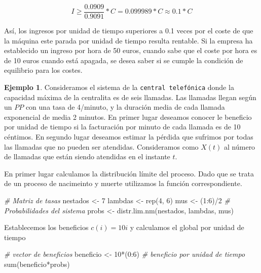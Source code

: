 \documentclass[
]{book}
\newenvironment{Shaded}{\begin{snugshade}}{\end{snugshade}}
\newcommand{\CommentTok}[1]{\textcolor[rgb]{0.56,0.35,0.01}{\textit{#1}}}
\newcommand{\DecValTok}[1]{\textcolor[rgb]{0.00,0.00,0.81}{#1}}
\newcommand{\FunctionTok}[1]{\textcolor[rgb]{0.00,0.00,0.00}{#1}}
\newcommand{\NormalTok}[1]{#1}
\newcommand{\OtherTok}[1]{\textcolor[rgb]{0.56,0.35,0.01}{#1}}
\newcommand{\SpecialCharTok}[1]{\textcolor[rgb]{0.00,0.00,0.00}{#1}}
\theoremstyle{definition}
\theoremstyle{definition}
\newtheorem{example}{Ejemplo}[chapter]
\theoremstyle{definition}
\theoremstyle{definition}
\theoremstyle{remark}
\begin{document}
\[I \geq \frac{0.0909}{0.9091}*C = 0.099989*C \approx 0.1*C\]

Así, los ingresos por unidad de tiempo superiores a 0.1 veces por el coste de que la máquina este parada por unidad de tiempo resulta rentable. Si la empresa ha establecido un ingreso por hora de 50 euros, cuando sabe que el coste por hora es de 10 euros cuando está apagada, se desea saber si se cumple la condición de equilibrio para los costes.

\begin{example}
Consideramos el sistema de la \texttt{central\ telefónica} donde la capacidad máxima de la centralita es de seis llamadas. Las llamadas llegan según un \(PP\) con una tasa de 4/minuto, y la duración media de cada llamada exponencial de media 2 minutos. En primer lugar deseamos conocer le beneficio por unidad de tiempo si la facturación por minuto de cada llamada es de 10 céntimos. En segundo lugar deseamos estimar la pérdida que sufrimos por todas las llamadas que no pueden ser atendidas. Consideramos como \(X(t)\) al número de llamadas que están siendo atendidas en el instante \(t\).
\end{example}

En primer lugar calculamos la distribución límite del proceso. Dado que se trata de un proceso de nacimeinto y muerte utilizamos la función correspondiente.

\begin{Shaded}
\begin{Highlighting}[]
\CommentTok{\# Matriz de tasas}
\NormalTok{nestados }\OtherTok{\textless{}{-}} \DecValTok{7}
\NormalTok{lambdas }\OtherTok{\textless{}{-}} \FunctionTok{rep}\NormalTok{(}\DecValTok{4}\NormalTok{, }\DecValTok{6}\NormalTok{) }
\NormalTok{mus }\OtherTok{\textless{}{-}}\NormalTok{ (}\DecValTok{1}\SpecialCharTok{:}\DecValTok{6}\NormalTok{)}\SpecialCharTok{/}\DecValTok{2}
\CommentTok{\# Probabilidades del sistema}
\NormalTok{probs }\OtherTok{\textless{}{-}} \FunctionTok{distr.lim.nm}\NormalTok{(nestados, lambdas, mus)}
\end{Highlighting}
\end{Shaded}

Establecemos los beneficios \(c(i) = 10i\) y calculamos el global por unidad de tiempo

\begin{Shaded}
\begin{Highlighting}[]
\CommentTok{\# vector de beneficios}
\NormalTok{beneficio }\OtherTok{\textless{}{-}} \DecValTok{10}\SpecialCharTok{*}\NormalTok{(}\DecValTok{0}\SpecialCharTok{:}\DecValTok{6}\NormalTok{) }
\CommentTok{\# beneficio por unidad de tiempo}
\FunctionTok{sum}\NormalTok{(beneficio}\SpecialCharTok{*}\NormalTok{probs)}
\end{Highlighting}
\end{Shaded}
\end{document}
